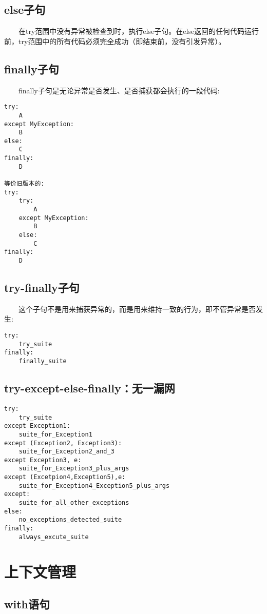 \documentclass[11pt,a4paper]{article}
\begin{document}
\begin{CJK*}{UTF8}{nsung}
\subsection{else子句}

~~~~在try范围中没有异常被检查到时，执行else子句。在else返回的任何代码运行前，try范围中的所有代码必须完全成功（即结束前，没有引发异常）。

\subsection{finally子句}
~~~~finally子句是无论异常是否发生、是否捕获都会执行的一段代码:
\begin{verbatim}
try:
    A
except MyException:
    B
else:
    C
finally:
    D

等价旧版本的:
try:
    try:
        A
    except MyException:
        B
    else:
        C
finally:
    D
\end{verbatim}

\subsection{try-finally子句}
~~~~这个子句不是用来捕获异常的，而是用来维持一致的行为，即不管异常是否发生:
\begin{verbatim}
try:
    try_suite
finally:
    finally_suite
\end{verbatim}

\subsection{try-except-else-finally：无一漏网}
\begin{verbatim}
try:
    try_suite
except Exception1:
    suite_for_Exception1
except (Exception2, Exception3):
    suite_for_Exception2_and_3
except Exception3, e:
    suite_for_Exception3_plus_args
except (Excetpion4,Exception5),e:
    suite_for_Exception4_Exception5_plus_args
except:
    suite_for_all_other_exceptions
else:
    no_exceptions_detected_suite
finally:
    always_excute_suite
\end{verbatim}

\section{上下文管理}
\subsection{with语句}


\end{CJK*}
\end{document}
